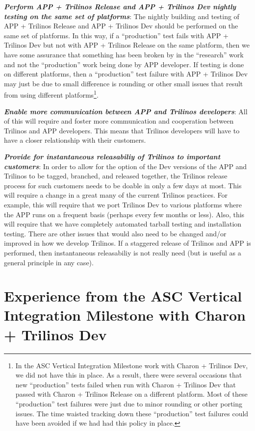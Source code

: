 \documentclass[pdf,ps2pdf,11pt]{SANDreport}
\begin{document}
{}\textit{\textbf{Perform APP + Trilinos Release and APP + Trilinos Dev
nightly testing on the same set of platforms}}: The nightly building and
testing of APP + Trilinos Release and APP + Trilinos Dev should be performed
on the same set of platforms.  In this way, if a ``production'' test fails
with APP + Trilinos Dev but not with APP + Trilinos Release on the same
platform, then we have some assurance that something has been broken by in the
``research'' work and not the ``production'' work being done by APP developer.
If testing is done on different platforms, then a ``production'' test failure
with APP + Trilinos Dev may just be due to small difference is rounding or
other small issues that result from using different platforms\footnote{In the
ASC Vertical Integration Milestone work with Charon + Trilinos Dev, we did not
have this in place.  As a result, there were several occasions that new
``production'' tests failed when run with Charon + Trilinos Dev that passed
with Charon + Trilinos Release on a different platform.  Most of these
``production'' test failures were just due to minor rounding or other porting
issues.  The time waisted tracking down these ``production'' test failures
could have been avoided if we had had this policy in place.}.

{}\textit{\textbf{Enable more communication between APP and Trilinos
developers}}: All of this will require and foster more communication and
cooperation between Trilinos and APP developers.  This means that Trilinos
developers will have to have a closer relationship with their customers.

{}\textit{\textbf{Provide for instantaneous releasabiliy of Trilinos to
important customers}}: In order to allow for the option of the Dev versions of
the APP and Trilinos to be tagged, branched, and released together, the
Trilinos release process for such customers needs to be doable in only a few
days at most.  This will require a change in a great many of the current
Trilinos practices.  For example, this will require that we port Trilinos Dev
to various platforms where the APP runs on a frequent basis (perhaps every few
months or less).  Also, this will require that we have completely automated
tarball testing and installation testing.  There are other issues that would
also need to be changed and/or improved in how we develop Trilinos.  If a
staggered release of Trilinos and APP is performed, then instantaneous
releasabiliy is not really need (but is useful as a general principle in any
case).


%
\section{Experience from the ASC Vertical Integration Milestone with Charon + Trilinos Dev}
%
\end{document}

